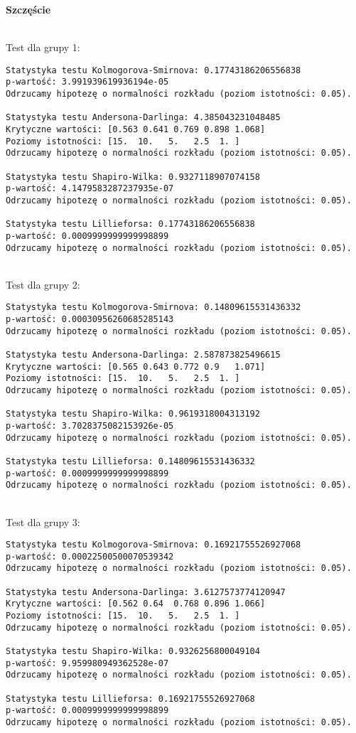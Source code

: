 \documentclass[12pt,a4paper]{article}
\begin{document}
\newpage
\begin{center}
    \textbf{Szczęście}
\end{center}
\\
Test dla grupy 1:
\begin{lstlisting}
Statystyka testu Kolmogorova-Smirnova: 0.17743186206556838
p-wartość: 3.991939619936194e-05
Odrzucamy hipotezę o normalności rozkładu (poziom istotności: 0.05).

Statystyka testu Andersona-Darlinga: 4.385043231048485
Krytyczne wartości: [0.563 0.641 0.769 0.898 1.068]
Poziomy istotności: [15.  10.   5.   2.5  1. ]
Odrzucamy hipotezę o normalności rozkładu (poziom istotności: 0.05).

Statystyka testu Shapiro-Wilka: 0.9327118907074158
p-wartość: 4.1479583287237935e-07
Odrzucamy hipotezę o normalności rozkładu (poziom istotności: 0.05).

Statystyka testu Lillieforsa: 0.17743186206556838
p-wartość: 0.0009999999999998899
Odrzucamy hipotezę o normalności rozkładu (poziom istotności: 0.05).
\end{lstlisting}
\\
Test dla grupy 2:
\begin{lstlisting}
Statystyka testu Kolmogorova-Smirnova: 0.14809615531436332
p-wartość: 0.00030956260685285143
Odrzucamy hipotezę o normalności rozkładu (poziom istotności: 0.05).

Statystyka testu Andersona-Darlinga: 2.587873825496615
Krytyczne wartości: [0.565 0.643 0.772 0.9   1.071]
Poziomy istotności: [15.  10.   5.   2.5  1. ]
Odrzucamy hipotezę o normalności rozkładu (poziom istotności: 0.05).

Statystyka testu Shapiro-Wilka: 0.9619318004313192
p-wartość: 3.7028375082153926e-05
Odrzucamy hipotezę o normalności rozkładu (poziom istotności: 0.05).

Statystyka testu Lillieforsa: 0.14809615531436332
p-wartość: 0.0009999999999998899
Odrzucamy hipotezę o normalności rozkładu (poziom istotności: 0.05).
\end{lstlisting}
\\
Test dla grupy 3:
\begin{lstlisting}
Statystyka testu Kolmogorova-Smirnova: 0.16921755526927068
p-wartość: 0.00022500500070539342
Odrzucamy hipotezę o normalności rozkładu (poziom istotności: 0.05).

Statystyka testu Andersona-Darlinga: 3.6127573774120947
Krytyczne wartości: [0.562 0.64  0.768 0.896 1.066]
Poziomy istotności: [15.  10.   5.   2.5  1. ]
Odrzucamy hipotezę o normalności rozkładu (poziom istotności: 0.05).

Statystyka testu Shapiro-Wilka: 0.9326256800049104
p-wartość: 9.959980949362528e-07
Odrzucamy hipotezę o normalności rozkładu (poziom istotności: 0.05).

Statystyka testu Lillieforsa: 0.16921755526927068
p-wartość: 0.0009999999999998899
Odrzucamy hipotezę o normalności rozkładu (poziom istotności: 0.05).
\end{lstlisting}
\end{document}
